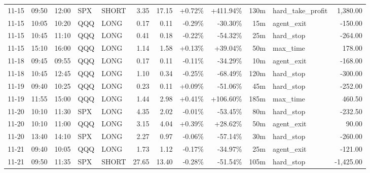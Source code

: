 \documentclass[11pt,a4paper,twoside]{article}
\begin{document}
\begin{center}
\begin{longtable}{>{\color{txtmain}}l l l l l r r r r r >{\color{txtmain}}l r}
11-15 & 09:50 & 12:00 & SPX & SHORT & 3.35 & 17.15 & \textcolor{wingreen}{+0.72\%} & \textcolor{wingreen}{+411.94\%} & 130m & hard\_take\_profit & \textcolor{wingreen}{1,380.00} \\
11-15 & 10:05 & 10:20 & QQQ & LONG & 0.17 & 0.11 & \textcolor{lossred}{-0.29\%} & \textcolor{lossred}{-30.30\%} & 15m & agent\_exit & \textcolor{lossred}{-150.00} \\
11-15 & 10:45 & 11:10 & QQQ & LONG & 0.41 & 0.18 & \textcolor{lossred}{-0.22\%} & \textcolor{lossred}{-54.32\%} & 25m & hard\_stop & \textcolor{lossred}{-264.00} \\
11-15 & 15:10 & 16:00 & QQQ & LONG & 1.14 & 1.58 & \textcolor{wingreen}{+0.13\%} & \textcolor{wingreen}{+39.04\%} & 50m & max\_time & \textcolor{wingreen}{178.00} \\
11-18 & 09:45 & 09:55 & QQQ & LONG & 0.17 & 0.11 & \textcolor{lossred}{-0.11\%} & \textcolor{lossred}{-34.29\%} & 10m & agent\_exit & \textcolor{lossred}{-168.00} \\
11-18 & 10:45 & 12:45 & QQQ & LONG & 1.10 & 0.34 & \textcolor{lossred}{-0.25\%} & \textcolor{lossred}{-68.49\%} & 120m & hard\_stop & \textcolor{lossred}{-300.00} \\
11-19 & 09:40 & 10:25 & QQQ & LONG & 0.23 & 0.11 & \textcolor{wingreen}{+0.09\%} & \textcolor{lossred}{-51.06\%} & 45m & hard\_stop & \textcolor{lossred}{-252.00} \\
11-19 & 11:55 & 15:00 & QQQ & LONG & 1.44 & 2.98 & \textcolor{wingreen}{+0.41\%} & \textcolor{wingreen}{+106.60\%} & 185m & max\_time & \textcolor{wingreen}{460.50} \\
11-20 & 10:10 & 11:30 & SPX & LONG & 4.35 & 2.02 & \textcolor{lossred}{-0.01\%} & \textcolor{lossred}{-53.45\%} & 80m & hard\_stop & \textcolor{lossred}{-232.50} \\
11-20 & 10:10 & 11:00 & QQQ & LONG & 3.15 & 4.04 & \textcolor{wingreen}{+0.39\%} & \textcolor{wingreen}{+28.62\%} & 50m & agent\_exit & \textcolor{wingreen}{90.00} \\
11-20 & 13:40 & 14:10 & SPX & LONG & 2.27 & 0.97 & \textcolor{lossred}{-0.06\%} & \textcolor{lossred}{-57.14\%} & 30m & hard\_stop & \textcolor{lossred}{-260.00} \\
11-21 & 09:40 & 10:05 & QQQ & LONG & 1.73 & 1.12 & \textcolor{lossred}{-0.17\%} & \textcolor{lossred}{-34.97\%} & 25m & agent\_exit & \textcolor{lossred}{-121.00} \\
11-21 & 09:50 & 11:35 & SPX & SHORT & 27.65 & 13.40 & \textcolor{lossred}{-0.28\%} & \textcolor{lossred}{-51.54\%} & 105m & hard\_stop & \textcolor{lossred}{-1,425.00} \\

\end{longtable}
\end{center}
\end{document}
